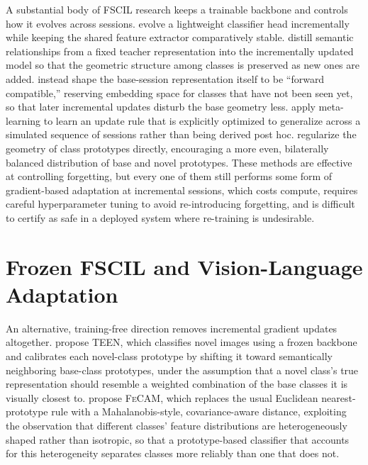 \documentclass{iutbscthesis}
\begin{document}
A substantial body of FSCIL research keeps a trainable backbone and controls how it evolves across sessions. \textcite{zhang2021continually} evolve a lightweight classifier head incrementally while keeping the shared feature extractor comparatively stable. \textcite{cheraghian2021semantic} distill semantic relationships from a fixed teacher representation into the incrementally updated model so that the geometric structure among classes is preserved as new ones are added. \textcite{zhou2022forward} instead shape the base-session representation itself to be ``forward compatible,'' reserving embedding space for classes that have not been seen yet, so that later incremental updates disturb the base geometry less. \textcite{chi2022metafscil} apply meta-learning to learn an update rule that is explicitly optimized to generalize across a simulated sequence of sessions rather than being derived post hoc. \textcite{zhao2023classaware} regularize the geometry of class prototypes directly, encouraging a more even, bilaterally balanced distribution of base and novel prototypes. These methods are effective at controlling forgetting, but every one of them still performs some form of gradient-based adaptation at incremental sessions, which costs compute, requires careful hyperparameter tuning to avoid re-introducing forgetting, and is difficult to certify as safe in a deployed system where re-training is undesirable.

\section{Frozen FSCIL and Vision-Language Adaptation}

An alternative, training-free direction removes incremental gradient updates altogether. \textcite{wang2023teen} propose \textsc{TEEN}, which classifies novel images using a frozen backbone and calibrates each novel-class prototype by shifting it toward semantically neighboring base-class prototypes, under the assumption that a novel class's true representation should resemble a weighted combination of the base classes it is visually closest to. \textcite{goswami2023fecam} propose \textsc{FeCAM}, which replaces the usual Euclidean nearest-prototype rule with a Mahalanobis-style, covariance-aware distance, exploiting the observation that different classes' feature distributions are heterogeneously shaped rather than isotropic, so that a prototype-based classifier that accounts for this heterogeneity separates classes more reliably than one that does not.
\end{document}
